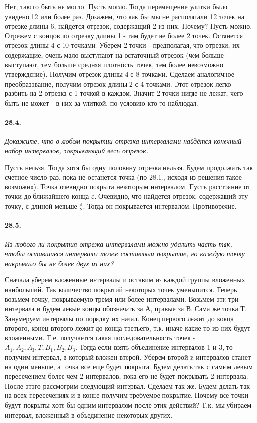 \documentclass{book}
\begin{document}
Нет, такого быть не могло. Пусть могло. Тогда перемещение улитки было увидено 12 или более раз. Докажем, что как бы мы не располагали 12 точек на отрезке длины 6, найдется отрезок, содержащий 2 из них. Почему? Пусть можно. Отрежем с концов по отрезку длины 1 - там будет не более 2 точек. Останется отрезок длины 4 с 10 точками. Уберем 2 точки - предполагая, что отрезки, их содержащие, очень мало выступают на остаточный отрезок (чем больше выступают, тем больше средняя плотность точек, тем более невозможно утверждение). Получим отрезок длины 4 с 8 точками. Сделаем аналогичное преобразование, получим отрезок длины 2 с 4 точками. Этот отрезок легко разбить на 2 отрезка с 1 точкой в каждом. Значит 2 точки нигде не лежат, чего быть не может - в них за улиткой, по условию кто-то наблюдал. 

\paragraph{28.4.}
\textit{Докажите, что в любом покрытии отрезка
интервалами найдётся конечный набор интервалов, покрывающий весь отрезок.}

Пусть нельзя. Тогда хотя бы одну половину отрезка нельзя. Будем продолжать так счетное число раз, пока не останется точка (по 28.1., исходя из решения такое возможно). Точка очевидно покрыта некоторым интервалом. Пусть расстояние от точки до ближайшего конца $\varepsilon$. Очевидно, что найдется отрезок, содержащий эту точку, с длиной меньше $\frac{\varepsilon}{2}$. Тогда он покрывается интервалом. Противоречие.

\paragraph{28.5.}
\textit{Из любого ли покрытия отрезка интервалами можно удалить часть так, чтобы оставшиеся интервалы тоже составляли покрытие, но каждую точку накрывало бы не более двух из них?}

Сначала уберем вложенные интервалы и оставим из каждой группы вложенных наибольший. Так количество покрытий некоторых точек уменьшится. Теперь возьмем точку, покрываемую тремя или более интервалами. Возьмем эти три интервала и будем левые концы обозначать за А, правые за В. Сама же точка Т. Занумеруем интервалы по порядку их начал. Конец первого лежит до конца второго, конец второго лежит до конца третьего, т.к. иначе какие-то из них будут вложенными. Т.е. получается такая последовательность точек - $A_1, A_2, A_3, T, B_1, B_2, B_3$. Тогда если взять объединение интервалов 1 и 3, то получим интервал, в который вложен второй. Уберем второй и интервалов станет на один меньше, а точка все еще будет покрыта. Будем делать так с самым левым пересечением более чем 2 интервалов, пока его не будет покрывать 2 интервала. После этого рассмотрим следующий интервал. Сделаем так же. Будем делать так на всех пересечениях и в конце получим требуемое покрытие. Почему все точки будут покрыты хотя бы одним интервалом после этих действий? Т.к. мы убираем интервал, вложенный в объединение некоторых других. 
\end{document}
